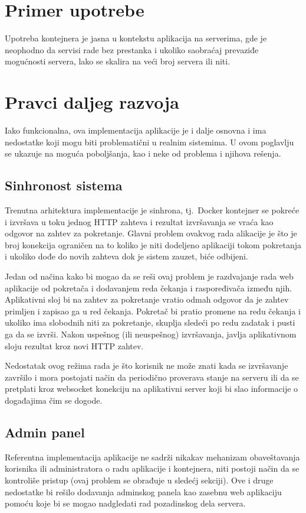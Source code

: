 \documentclass[12pt]{report}
\begin{document}
\chapter{Primer upotrebe}
Upotreba kontejnera je jasna u kontekstu aplikacija na serverima, gde je neophodno da servisi rade bez prestanka i ukoliko saobraćaj prevaziđe mogućnosti servera, lako se skalira na veći broj servera ili niti.



\chapter{Pravci daljeg razvoja}
Iako funkcionalna, ova implementacija aplikacije je i dalje osnovna i ima nedostatke koji mogu biti problematični u realnim sistemima. U ovom poglavlju se ukazuje na moguća poboljšanja, kao i neke od problema i njihova rešenja.

\section{Sinhronost sistema}
Trenutna arhitektura implementacije je sinhrona, tj.\ Docker kontejner se pokreće i izvršava u toku jednog \acrshort{HTTP} zahteva i rezultat izvršavanja se vraća kao odgovor na zahtev za pokretanje. Glavni problem ovakvog rada alikacije je što je broj konekcija ograničen na to koliko je niti dodeljeno aplikaciji tokom pokretanja i ukoliko dođe do novih zahteva dok je sistem zauzet, biće odbijeni.

Jedan od načina kako bi mogao da se reši ovaj problem je razdvajanje rada web aplikacije od pokretača i dodavanjem reda čekanja i raspoređivača između njih. Aplikativni sloj bi na zahtev za pokretanje vratio odmah odgovor da je zahtev primljen i zapisao ga u red čekanja. Pokretač bi pratio promene na redu čekanja i ukoliko ima slobodnih niti za pokretanje, skuplja sledeći po redu zadatak i pusti ga da se izvrši. Nakon uspešnog (ili neuspešnog) izvršavanja, javlja aplikativnom sloju rezultat kroz novi \acrshort{HTTP} zahtev.

Nedostatak ovog režima rada je što korisnik ne može znati kada se izvršavanje završilo i mora postojati način da periodično proverava stanje na serveru ili da se pretplati kroz websocket konekciju na aplikativni server koji bi slao informacije o događajima čim se dogode.

\section{Admin panel}
Referentna implementacija aplikacije ne sadrži nikakav mehanizam obaveštavanja korisnika ili administratora o radu aplikacije i kontejnera, niti postoji način da se kontroliše pristup (ovaj problem se obrađuje u sledećj sekciji). Ove i druge nedostatke bi rešilo dodavanja adminskog panela kao zasebnu web aplikaciju pomoću koje bi se mogao nadgledati rad pozadinskog dela servera.
\end{document}

